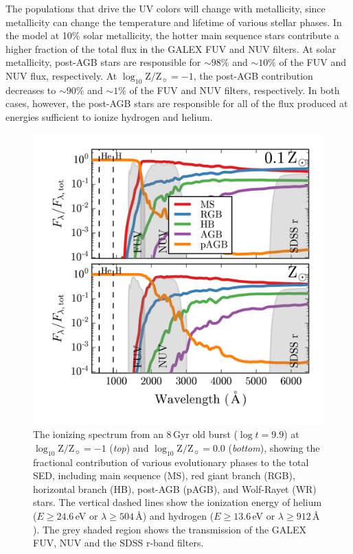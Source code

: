 \documentclass[preprint2]{aastex62}
\newcommand{\logten}{\ensuremath{\log_{10}}}
\newcommand{\logZeq}[1]{\ensuremath{\logten \mathrm{Z}/\mathrm{Z}_{\sun} = #1}}
\newcommand{\ang}{\ensuremath{\mbox{\AA}}\xspace}
\newcommand{\Gyr}{$\,$Gyr\xspace}
\begin{document}
The populations that drive the UV colors will change with metallicity, since metallicity can change the temperature and lifetime of various stellar phases. In the model at 10\% solar metallicity, the hotter main sequence stars contribute a higher fraction of the total flux in the GALEX FUV and NUV filters. At solar metallicity, post-AGB stars are responsible for $\sim98\%$ and $\sim10\%$ of the FUV and NUV flux, respectively. At \logZeq{-1}, the post-AGB contribution decreases to $\sim90\%$ and $\sim1\%$ of the FUV and NUV filters, respectively. In both cases, however, the post-AGB stars are responsible for all of the flux produced at energies sufficient to ionize hydrogen and helium. 
\begin{figure}
  \begin{center}
    \includegraphics[width=\linewidth]{figs/f2.png}
    \caption{The ionizing spectrum from an 8\Gyr old burst ($\log t=9.9$) at \logZeq{-1} (\emph{top}) and \logZeq{0.0} (\emph{bottom}), showing the fractional contribution of various evolutionary phases to the total SED, including main sequence (MS), red giant branch (RGB), horizontal branch (HB), post-AGB (pAGB), and Wolf-Rayet (WR) stars. The vertical dashed lines show the ionization energy of helium ($E\geq24.6\,$eV or $\lambda \geq 504\,$\ang) and hydrogen ($E\geq13.6\,$eV or $\lambda \geq 912\,$\ang). The grey shaded region shows the transmission of the GALEX FUV, NUV and the SDSS r-band filters.}
    \label{fig:FracSpec}
  \end{center}
\end{figure}
\end{document}
